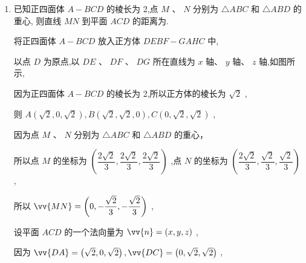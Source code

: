 \begin{enumerate}
\begin{jieda}
        设 $\vv{n} = \left( {x,y,z}\right)$ 为平面 ${ABC}$ 的一个法向量,
        
        则 $\left\{  \begin{array}{l} \vv{n} \cdot  \vv{AB} = \dfrac{\sqrt{3}}{2}x + \dfrac{1}{2}z = 0 \\  \vv{n} \cdot  \vv{AC} = \dfrac{1}{2}x + \dfrac{\sqrt{3}}{2}y = 0 \end{array}\right.$ ,所以 $y =  - \dfrac{\sqrt{3}}{3}x,z =  - \sqrt{3}x$ ,
        
        可取 $\vv{n} = \left( {-\sqrt{3},1,3}\right)$ ,代入 $d = \dfrac{\left| \vv{DC} \cdot  \vv{n}\right| }{\left| \vv{n}\right| }$ ,得 $d = \dfrac{\dfrac{\sqrt{3}}{2} + \dfrac{\sqrt{3}}{2}}{\sqrt{13}} = \dfrac{\sqrt{39}}{13}$ ,
        
        即点 $D$ 到平面 ${ABC}$ 的距离是 $\dfrac{\sqrt{39}}{13}$.
    \end{jieda}

    \item 已知正四面体 $A - {BCD}$ 的棱长为 2,点 $M\text{ 、 }N$ 分别为 $\bigtriangleup  {ABC}$ 和 $\bigtriangleup  {ABD}$ 的重心, 则直线 ${MN}$ 到平面 ${ACD}$ 的距离为.
    \begin{jieda}
        将正四面体 $A - {BCD}$ 放入正方体 ${DEBF} - {GAHC}$ 中,
        
        以点 $D$ 为原点,以 ${DE}\text{ 、 }{DF}\text{ 、 }{DG}$ 所在直线为 $x$ 轴、 $y$ 轴、 $z$ 轴,如图所示,
        
        因为正四面体 $A - {BCD}$ 的棱长为 2,所以正方体的棱长为 $\sqrt{2}$ ,
        
        则 $A\left( {\sqrt{2},0,\sqrt{2}}\right) ,B\left( {\sqrt{2},\sqrt{2},0}\right) ,C\left( {0,\sqrt{2},\sqrt{2}}\right)$ ,
        
        因为点 $M\text{ 、 }N$ 分别为 $\bigtriangleup  {ABC}$ 和 $\bigtriangleup  {ABD}$ 的重心，
        
        所以点 $M$ 的坐标为 $\left( {\dfrac{2\sqrt{2}}{3},\dfrac{2\sqrt{2}}{3},\dfrac{2\sqrt{2}}{3}}\right)$ ,点 $N$ 的坐标为 $\left( {\dfrac{2\sqrt{2}}{3},\dfrac{\sqrt{2}}{3},\dfrac{\sqrt{2}}{3}}\right)$ ,
        
        所以 $\vv{MN} = \left( {0, - \dfrac{\sqrt{2}}{3}, - \dfrac{\sqrt{2}}{3}}\right)$ ,
        
        设平面 ${ACD}$ 的一个法向量为 $\vv{n} = \left( {x,y,z}\right)$ ,
        
        因为 $\vv{DA} = \left( {\sqrt{2},0,\sqrt{2}}\right) ,\vv{DC} = \left( {0,\sqrt{2},\sqrt{2}}\right)$ ,
        

\end{jieda}
\end{enumerate}
